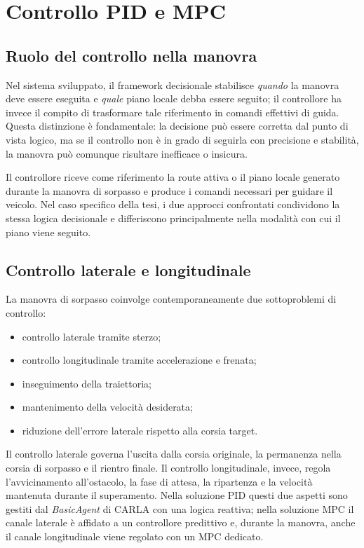 \chapter{Controllo PID e MPC}

\section{Ruolo del controllo nella manovra}

Nel sistema sviluppato, il framework decisionale stabilisce \emph{quando} la manovra deve essere eseguita e \emph{quale} piano locale debba essere seguito; il controllore ha invece il compito di trasformare tale riferimento in comandi effettivi di guida. Questa distinzione è fondamentale: la decisione può essere corretta dal punto di vista logico, ma se il controllo non è in grado di seguirla con precisione e stabilità, la manovra può comunque risultare inefficace o insicura.

Il controllore riceve come riferimento la route attiva o il piano locale generato durante la manovra di sorpasso e produce i comandi necessari per guidare il veicolo. Nel caso specifico della tesi, i due approcci confrontati condividono la stessa logica decisionale e differiscono principalmente nella modalità con cui il piano viene seguito.

\section{Controllo laterale e longitudinale}

La manovra di sorpasso coinvolge contemporaneamente due sottoproblemi di controllo:

\begin{itemize}
    \item controllo laterale tramite sterzo;
    \item controllo longitudinale tramite accelerazione e frenata;
    \item inseguimento della traiettoria;
    \item mantenimento della velocità desiderata;
    \item riduzione dell'errore laterale rispetto alla corsia target.
\end{itemize}

Il controllo laterale governa l'uscita dalla corsia originale, la permanenza nella corsia di sorpasso e il rientro finale. Il controllo longitudinale, invece, regola l'avvicinamento all'ostacolo, la fase di attesa, la ripartenza e la velocità mantenuta durante il superamento. Nella soluzione PID questi due aspetti sono gestiti dal \textit{BasicAgent} di CARLA con una logica reattiva; nella soluzione MPC il canale laterale è affidato a un controllore predittivo e, durante la manovra, anche il canale longitudinale viene regolato con un MPC dedicato.

